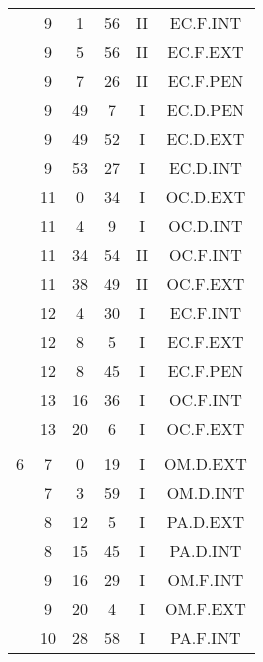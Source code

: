 \documentclass[12pt, a4paper]{article}
\begin{document}
\begin{multicols}{3}
{\begin{tabular}{c c c c c c}
	 	 	 	 & 9 & 1 & 56 & II & EC.F.INT\\%
	 	 	 	 & 9 & 5 & 56 & II & EC.F.EXT\\%
	 	 	 	 & 9 & 7 & 26 & II & EC.F.PEN\\%
	 	 	 	 & 9 & 49 & 7 & I & EC.D.PEN\\%
	 	 	 	 & 9 & 49 & 52 & I & EC.D.EXT\\%
	 	 	 	 & 9 & 53 & 27 & I & EC.D.INT\\%
	 	 	 	 & 11 & 0 & 34 & I & OC.D.EXT\\%
	 	 	 	 & 11 & 4 & 9 & I & OC.D.INT\\%
	 	 	 	 & 11 & 34 & 54 & II & OC.F.INT\\%
	 	 	 	 & 11 & 38 & 49 & II & OC.F.EXT\\%
	 	 	 	 & 12 & 4 & 30 & I & EC.F.INT\\%
	 	 	 	 & 12 & 8 & 5 & I & EC.F.EXT\\%
	 	 	 	 & 12 & 8 & 45 & I & EC.F.PEN\\%
	 	 	 	 & 13 & 16 & 36 & I & OC.F.INT\\%
	 	 	 	 & 13 & 20 & 6 & I & OC.F.EXT\\%
	 	 	 	 & & & & & \\%
	 	 	 	6 & 7 & 0 & 19 & I & OM.D.EXT\\%
	 	 	 	 & 7 & 3 & 59 & I & OM.D.INT\\%
	 	 	 	 & 8 & 12 & 5 & I & PA.D.EXT\\%
	 	 	 	 & 8 & 15 & 45 & I & PA.D.INT\\%
	 	 	 	 & 9 & 16 & 29 & I & OM.F.INT\\%
	 	 	 	 & 9 & 20 & 4 & I & OM.F.EXT\\%
	 	 	 	 & 10 & 28 & 58 & I & PA.F.INT\\%

\end{tabular}}
\end{multicols}
\end{document}
